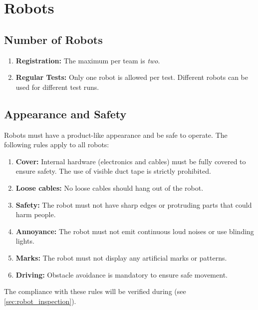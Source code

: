 \section{Robots}\label{rule:robots}

\subsection{Number of Robots}\label{rule:robots_number}

\begin{enumerate}
	\item \textbf{Registration:} The maximum  per team is \emph{two}.
	\item \textbf{Regular Tests:} Only one robot is allowed per test. Different robots can be used for different test runs.
\end{enumerate}

\subsection{Appearance and Safety}\label{rule:robot_appearance}

Robots must have a product-like appearance and be safe to operate.
The following rules apply to all robots:
\begin{enumerate}
	\item \textbf{Cover:} Internal hardware (electronics and cables) must be fully covered to ensure safety. The use of visible duct tape is strictly prohibited.
	\item \textbf{Loose cables:} No loose cables should hang out of the robot.
	\item \textbf{Safety:} The robot must not have sharp edges or protruding parts that could harm people.
	\item \textbf{Annoyance:} The robot must not emit continuous loud noises or use blinding lights.
	\item \textbf{Marks:} The robot must not display any artificial marks or patterns.
	\item \textbf{Driving:} Obstacle avoidance is mandatory to ensure safe movement.
\end{enumerate}
The compliance with these rules will be verified during \RobotInspection{} (see \ref{sec:robot_inspection}).

%






